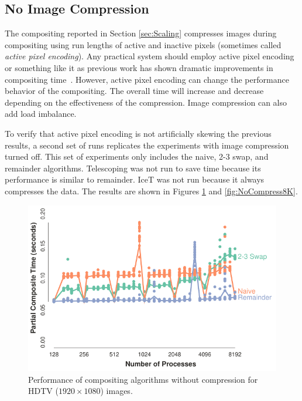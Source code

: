 \documentclass{vgtc}                          %
\newcommand*{\lcite}[1]{~\cite{#1}}
\newcommand*{\keyterm}[1]{\emph{#1}}
\newcommand{\textalgorithm}[1]{\textsf{#1}\xspace}
\newcommand{\ttswap}{\textalgorithm{2-3 swap}}
\newcommand{\naive}{\textalgorithm{naive}}
\newcommand{\Telescoping}{\textalgorithm{Telescoping}}
\newcommand{\remainder}{\textalgorithm{remainder}}
\begin{document}
\subsection{No Image Compression}
\label{sec:FullImages}

The compositing reported in Section \ref{sec:Scaling} compresses images during compositing using run lengths of active and inactive pixels (sometimes called \keyterm{active pixel encoding}).
Any practical system should employ active pixel encoding or something like it as previous work has shown dramatic improvements in compositing time\lcite{Ahrens1998,Yang1999,Moreland2001,Takeuchi2003}.
However, active pixel encoding can change the performance behavior of the compositing.
The overall time will increase and decrease depending on the effectiveness of the compression.
Image compression can also add load imbalance.

To verify that active pixel encoding is not artificially skewing the previous results, a second set of runs replicates the experiments with image compression turned off.
This set of experiments only includes the \naive, \ttswap, and \remainder algorithms.
\Telescoping was not run to save time because its performance is similar to \remainder.
IceT was not run because it always compresses the data.
The results are shown in Figures \ref{fig:NoCompressHDTV} and \ref{fig:NoCompress8K}.

\begin{figure}
  \centering
  \includegraphics[width=\linewidth]{no-compress-hdtv}
  \caption{
    Performance of compositing algorithms without compression for HDTV ($1920 \times 1080$) images.
  }
  \label{fig:NoCompressHDTV}
\end{figure}
\end{document}
